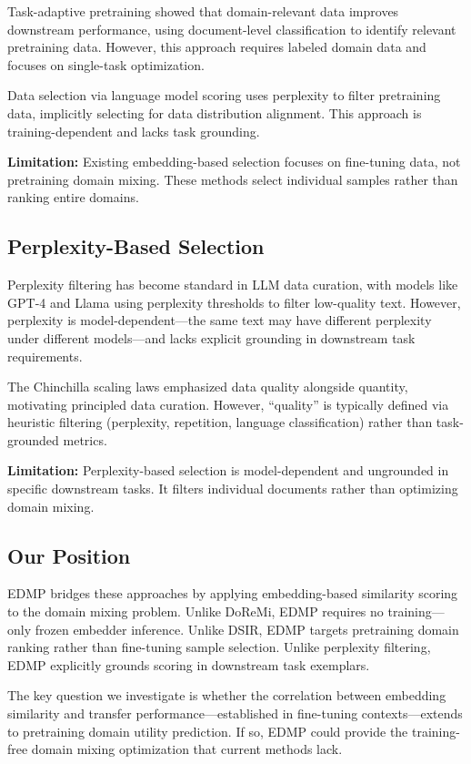 Task-adaptive pretraining \cite{gururangan2020dont} showed that domain-relevant data improves downstream performance, using document-level classification to identify relevant pretraining data. However, this approach requires labeled domain data and focuses on single-task optimization.

Data selection via language model scoring \cite{marion2023less} uses perplexity to filter pretraining data, implicitly selecting for data distribution alignment. This approach is training-dependent and lacks task grounding.

\textbf{Limitation:} Existing embedding-based selection focuses on fine-tuning data, not pretraining domain mixing. These methods select individual samples rather than ranking entire domains.

\subsection{Perplexity-Based Selection}

Perplexity filtering has become standard in LLM data curation, with models like GPT-4 and Llama using perplexity thresholds to filter low-quality text. However, perplexity is model-dependent---the same text may have different perplexity under different models---and lacks explicit grounding in downstream task requirements.

The Chinchilla scaling laws \cite{hoffmann2022training} emphasized data quality alongside quantity, motivating principled data curation. However, ``quality'' is typically defined via heuristic filtering (perplexity, repetition, language classification) rather than task-grounded metrics.

\textbf{Limitation:} Perplexity-based selection is model-dependent and ungrounded in specific downstream tasks. It filters individual documents rather than optimizing domain mixing.

\subsection{Our Position}

EDMP bridges these approaches by applying embedding-based similarity scoring to the domain mixing problem. Unlike DoReMi, EDMP requires no training---only frozen embedder inference. Unlike DSIR, EDMP targets pretraining domain ranking rather than fine-tuning sample selection. Unlike perplexity filtering, EDMP explicitly grounds scoring in downstream task exemplars.

The key question we investigate is whether the correlation between embedding similarity and transfer performance---established in fine-tuning contexts---extends to pretraining domain utility prediction. If so, EDMP could provide the training-free domain mixing optimization that current methods lack.
